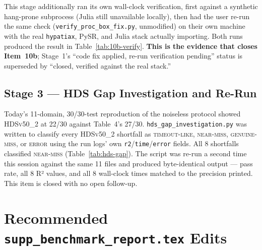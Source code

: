 \documentclass[twoside,11pt]{article}
\newcommand{\HDS}{\textsc{HDSv50\_2}}
\begin{document}
This stage additionally ran its own wall-clock verification, first
against a synthetic hang-prone subprocess (Julia still unavailable
locally), then had the user re-run the same check
(\texttt{verify\_proc\_box\_fix.py}, unmodified) on their own machine
with the real \texttt{hypatiax}, PySR, and Julia stack actually
importing. Both runs produced the result in
Table~\ref{tab:10b-verify}. \textbf{This is the evidence that closes
Item~10b}; Stage~1's ``code fix applied, re-run verification pending''
status is superseded by ``closed, verified against the real stack.''

\subsection{Stage 3 --- HDS Gap Investigation and Re-Run}

Today's 11-domain, 30/30-test reproduction of the noiseless protocol
showed \HDS{} at 22/30 against Table~4's 27/30.
\texttt{hds\_gap\_investigation.py} was written to classify every
\HDS{} shortfall as \textsc{timeout-like}, \textsc{near-miss},
\textsc{genuine-miss}, or \textsc{error} using the run logs' own
\texttt{r2}/\texttt{time}/\texttt{error} fields. All 8 shortfalls
classified \textsc{near-miss} (Table~\ref{tab:hds-gap}). The script was
re-run a second time this session against the same 11 files and
produced byte-identical output --- pass rate, all 8 R² values, and all
8 wall-clock times matched to the precision printed. This item is
closed with no open follow-up.

\section{Recommended \texttt{supp\_benchmark\_report.tex} Edits}
\label{sec:history:supp-edits}
\end{document}
